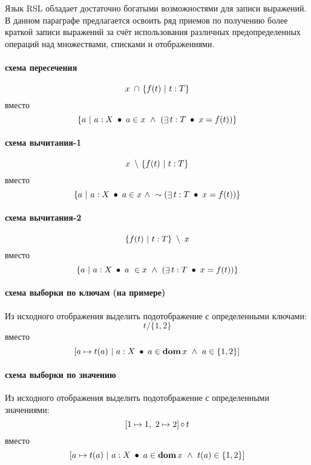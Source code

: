 \documentclass[14pt, twoside]{extreport}
\begin{document}
Язык RSL обладает достаточно богатыми возможностями для записи выражений. В данном параграфе предлагается освоить ряд приемов по получению более краткой записи выражений за счёт использования различных предопределенных операций над множествами, списками и отображениями.

\paragraph{схема пересечения}

$$x~\mathop{\cap}~ \{f(t) ~|~ t:T\}$$ вместо $$\{a ~|~ a: X ~\mathop{\bullet}~ a \in x ~\wedge~ ( \mathop{\exists} t: T  ~\mathop{\bullet}~ x = f(t) ) \}$$

\paragraph{схема вычитания-1}

$$x ~\mathop{\setminus}~ \{f(t) ~|~ t:T\}$$ вместо $$\{a ~|~ a: X ~\mathop{\bullet}~ a \in x ~\wedge~  \sim( \mathop{\exists} t: T  ~\mathop{\bullet}~ x = f(t) ) \}$$

\paragraph{схема вычитания-2}

$$\{f(t) ~|~ t:T\} ~\mathop{\setminus}~ x$$ вместо $$\{a ~|~ a: X ~\mathop{\bullet}~ a ~\in x ~\wedge~ ( \mathop{\exists} t: T  ~\mathop{\bullet}~ x = f(t) ) \}$$

\paragraph{схема выборки по ключам (на примере)}
Из исходного отображения выделить подотображение с определенными ключами:
$$t / \{1, 2\}$$ вместо $$[a \mapsto t(a) ~|~ a:X ~\mathop{\bullet}~ a \in \mathop{\textbf{dom}} x ~\wedge~ a \in \{1, 2\} ]$$

\paragraph{схема выборки по значению}
Из исходного отображения выделить подотображение с определенными значениями:
$$[1 \mapsto 1,~ 2 \mapsto 2] \mathop{\circ} t$$ вместо $$[a \mapsto t(a) ~|~ a:X ~\mathop{\bullet}~ a \in \mathop{\textbf{dom}} x ~\wedge~ t(a) \in \{1,2\} ]$$

%
\end{document}
